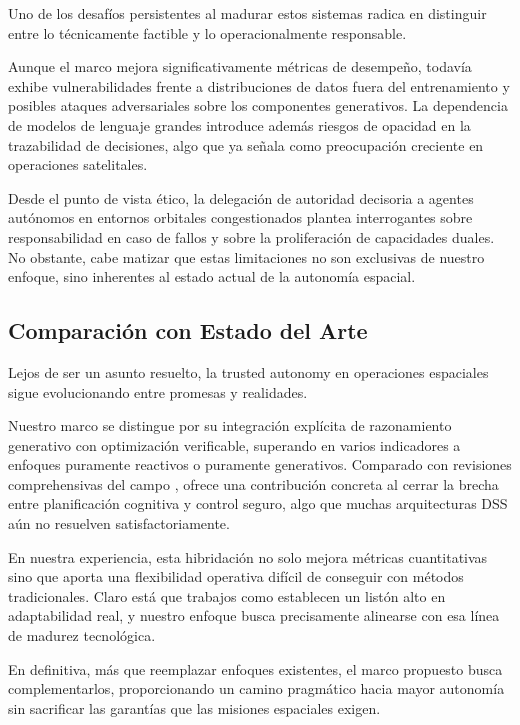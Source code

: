 Uno de los desafíos persistentes al madurar estos sistemas radica en distinguir entre lo técnicamente factible y lo operacionalmente responsable. 

Aunque el marco mejora significativamente métricas de desempeño, todavía exhibe vulnerabilidades frente a distribuciones de datos fuera del entrenamiento y posibles ataques adversariales sobre los componentes generativos. La dependencia de modelos de lenguaje grandes introduce además riesgos de opacidad en la trazabilidad de decisiones, algo que \cite{Li2025_AIAgents} ya señala como preocupación creciente en operaciones satelitales.

Desde el punto de vista ético, la delegación de autoridad decisoria a agentes autónomos en entornos orbitales congestionados plantea interrogantes sobre responsabilidad en caso de fallos y sobre la proliferación de capacidades duales. No obstante, cabe matizar que estas limitaciones no son exclusivas de nuestro enfoque, sino inherentes al estado actual de la autonomía espacial.

\subsection{Comparación con Estado del Arte}

Lejos de ser un asunto resuelto, la trusted autonomy en operaciones espaciales sigue evolucionando entre promesas y realidades. 

Nuestro marco se distingue por su integración explícita de razonamiento generativo con optimización verificable, superando en varios indicadores a enfoques puramente reactivos o puramente generativos. Comparado con revisiones comprehensivas del campo \cite{Thangavel2024}, ofrece una contribución concreta al cerrar la brecha entre planificación cognitiva y control seguro, algo que muchas arquitecturas DSS aún no resuelven satisfactoriamente.

En nuestra experiencia, esta hibridación no solo mejora métricas cuantitativas sino que aporta una flexibilidad operativa difícil de conseguir con métodos tradicionales. Claro está que trabajos como \cite{Basciani2026_RA} establecen un listón alto en adaptabilidad real, y nuestro enfoque busca precisamente alinearse con esa línea de madurez tecnológica.

En definitiva, más que reemplazar enfoques existentes, el marco propuesto busca complementarlos, proporcionando un camino pragmático hacia mayor autonomía sin sacrificar las garantías que las misiones espaciales exigen.